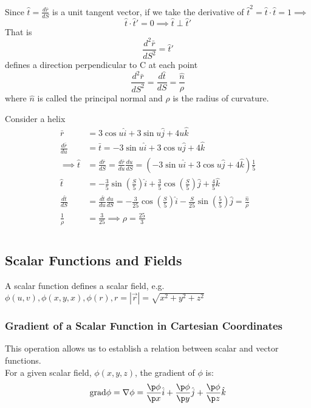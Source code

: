 \documentclass[a4paper, 11pt, normalem]{report}
\begin{document}
Since $\hat{t} = \frac{d\bar{r}}{dS}$ is a unit tangent vector, if we take the derivative of $\hat{t}^2 = \hat{t} \cdot \hat{t} = 1 \implies$
\begin{equation*}
    \hat{t} \cdot \hat{t}' = 0 \implies \hat{t} \perp \hat{t}'
\end{equation*}
That is
\begin{equation*}
    \frac{d^2\bar{r}}{dS^2} = \hat{t}'
\end{equation*}
defines a direction perpendicular to C at each point
\begin{equation*}
    \frac{d^2\bar{r}}{dS^2} = \frac{d\hat{t}}{dS} = \frac{\hat{n}}{\rho}
\end{equation*}
where $\hat{n}$ is called the principal normal and $\rho$ is the radius of curvature.

Consider a helix
\begin{align*}
    \bar{r} &= 3\cos u\hat{i} + 3\sin u \hat{j} + 4u\hat{k} \\
    \frac{d\bar{r}}{du} &= \bar{t} = -3\sin u\hat{i} + 3\cos u\hat{j} + 4\hat{k}\\
    \implies \hat{t} &= \frac{d\bar{r}}{dS} = \frac{d\bar{r}}{du}\frac{du}{dS} = (-3\sin u\hat{i} + 3\cos u\hat{j} + 4\hat{k})\frac{1}{5} \\
    \hat{t} &= - \frac{3}{5} \sin(\frac{S}{5}) \hat{i} + \frac{3}{5} \cos (\frac{S}{5})\hat{j} + \frac{4}{5}\hat{k} \\
    \frac{d\hat{t}}{dS} &= \frac{d\hat{t}}{du}\frac{du}{dS} = -\frac{3}{25}\cos(\frac{S}{5})\hat{i} -\frac{S}{25}\sin(\frac{5}{5})\hat{j} = \frac{\hat{n}}{\rho} \\
    \frac{1}{\rho} &= \frac{3}{25} \implies \rho = \frac{25}{3}
\end{align*}

\chapter{}
\section{Scalar Functions and Fields}
A scalar function defines a scalar field, e.g. $\phi(u, v), \phi(x,y,x), \phi(r), r = |\vec{r}| = \sqrt{x^2 + y^2 + z^2}$

\subsection{Gradient of a Scalar Function in Cartesian Coordinates}
This operation allows us to establish a relation between scalar and vector functions. \\
For a given scalar field, $\phi(x,y,z)$, the gradient of $\phi$ is:
\begin{equation*}
    \text{grad}\phi = \nabla\phi = \frac{\p \phi}{\p x}\hat{i} + \frac{\p\phi}{\p y}\hat{j} + \frac{\p\phi}{\p z}\hat{k}
\end{equation*}
\end{document}
